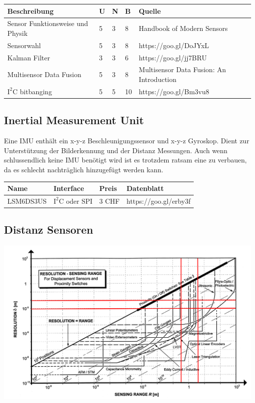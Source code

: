 \documentclass[a4paper]{report}
\begin{document}
\vspace{1em}
\noindent
\begin{tabular}{|p{}|p{}|p{}|p{}|p{}|}
	\hline
	\textbf{Beschreibung} & \textbf{U} & \textbf{N} & \textbf{B} & \textbf{Quelle} \\
	\hline
	Sensor Funktionsweise und Physik & 5 & 3 & 8 & Handbook of Modern Sensors \\
	\hline
	Sensorwahl & 5 & 3 & 8 & https://goo.gl/DoJYxL \\
	\hline
	Kalman Filter & 3 & 3 & 6 & https://goo.gl/jj7BRU \\
	\hline
	Multisensor Data Fusion & 5 & 3 & 8 & Multisensor Data Fusion: An Introduction \\
	\hline
	$\text{I}^2\text{C}$ bitbanging & 5 & 5 & 10 & https://goo.gl/Bm3vu8 \\
	\hline
\end{tabular}

\vspace{1em}
\noindent

\subsection{Inertial Measurement Unit}
Eine IMU enthält ein x-y-z Beschleunigungssensor und x-y-z
Gyroskop. Dient zur Unterstützung der Bilderkennung und der Distanz
Messungen. Auch wenn schlussendlich keine IMU benötigt wird ist es trotzdem
ratsam eine zu verbauen, da es schlecht nachträglich hinzugefügt werden kann.

\vspace{1em}
\noindent
\begin{tabular}{|p{}|p{}|p{}|p{}|}
  \hline
  \textbf{Name} & \textbf{Interface} & \textbf{Preis} & \textbf{Datenblatt} \\
  \hline
  LSM6DS3US & $\text{I}^2\text{C}$ oder SPI & 3 CHF & https://goo.gl/erby3f \\
  \hline
\end{tabular}

\subsection{Distanz Sensoren}
\includegraphics[width=\textwidth]{DistanzSensor}
\end{document}
